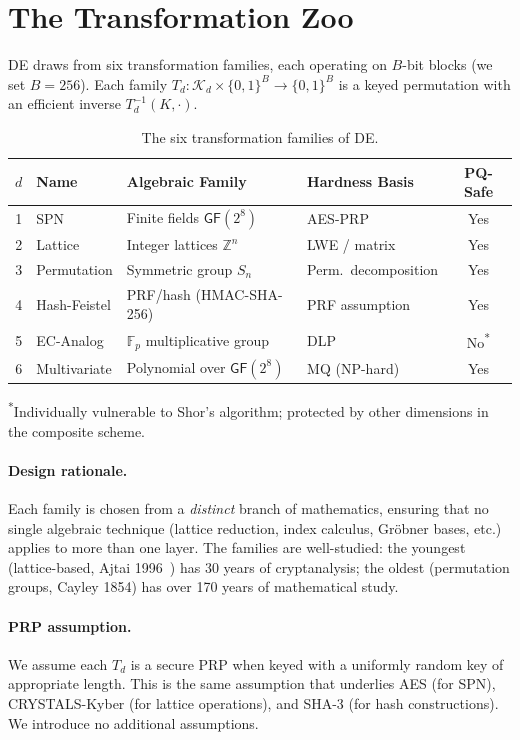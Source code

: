 \documentclass[11pt]{article}
\newcommand{\DE}{\textsf{DE}}
\newcommand{\Z}{\mathbb{Z}}
\newcommand{\F}{\mathbb{F}}
\begin{document}
\section{The Transformation Zoo}
\label{sec:zoo}

\DE{} draws from six transformation families, each operating on $B$-bit
blocks (we set $B = 256$). Each family $T_d: \mathcal{K}_d \times \{0,1\}^B
\to \{0,1\}^B$ is a keyed permutation with an efficient inverse
$T_d^{-1}(K, \cdot)$.

\begin{table}[h]
\centering
\caption{The six transformation families of \DE.}
\label{tab:zoo}
\begin{tabular}{@{}clllc@{}}
\toprule
$d$ & Name & Algebraic Family & Hardness Basis & PQ-Safe \\
\midrule
1 & SPN & Finite fields $\textsf{GF}(2^8)$ & AES-PRP & Yes \\
2 & Lattice & Integer lattices $\Z^n$ & LWE / matrix & Yes \\
3 & Permutation & Symmetric group $S_n$ & Perm.\ decomposition & Yes \\
4 & Hash-Feistel & PRF/hash (HMAC-SHA-256) & PRF assumption & Yes \\
5 & EC-Analog & $\F_p$ multiplicative group & DLP & No\textsuperscript{*} \\
6 & Multivariate & Polynomial over $\textsf{GF}(2^8)$ & MQ (NP-hard) & Yes \\
\bottomrule
\end{tabular}

\smallskip
\textsuperscript{*}Individually vulnerable to Shor's algorithm; protected
by other dimensions in the composite scheme.
\end{table}

\paragraph{Design rationale.}
Each family is chosen from a \emph{distinct} branch of mathematics, ensuring
that no single algebraic technique (lattice reduction, index calculus,
Gr\"obner bases, etc.) applies to more than one layer. The families are
well-studied: the youngest (lattice-based, Ajtai 1996~\cite{ajtai1996})
has 30 years of cryptanalysis; the oldest (permutation groups, Cayley 1854)
has over 170 years of mathematical study.

\paragraph{PRP assumption.}
We assume each $T_d$ is a secure PRP when keyed with a uniformly random
key of appropriate length. This is the same assumption that underlies
AES (for SPN), CRYSTALS-Kyber (for lattice operations), and SHA-3 (for
hash constructions). We introduce no additional assumptions.
\end{document}
